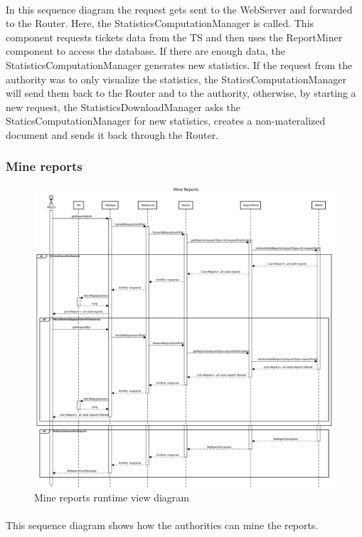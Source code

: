 					\paragraph{}
						In this sequence diagram the request gets sent to the WebServer and forwarded to the Router. Here, the StatisticsComputationManager is called. This component requests tickets data from the TS and then uses the ReportMiner component to access the database. If there are enough data, the StatisticsComputationManager generates new statistics. If the request from the authority was to only visualize the statistics, the StaticsComputationManager will send them back to the Router and to the authority, otherwise, by starting a new request, the StatisticsDownloadManager asks the StaticsComputationManager for new statistics, creates a non-materalized document and sends it back through the Router.
				\clearpage
				\subsubsection{Mine reports}
					\begin{figure}[!h]
						\centering
						\includegraphics[width=\textwidth]{images/DD2/RuntimeView/Authority/MineReports.pdf}
						\caption{Mine reports runtime view diagram}
					\end{figure}
					\paragraph{}
						This sequence diagram shows how the authorities can mine the reports. 
						
